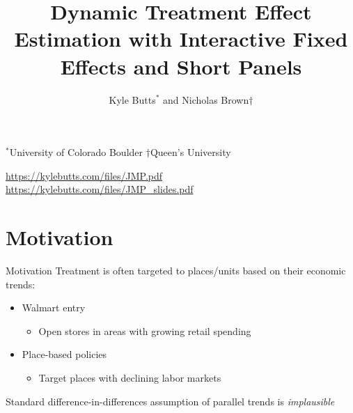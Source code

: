 \documentclass[aspectratio=169,t,11pt]{beamer}
\title{Dynamic Treatment Effect Estimation with Interactive Fixed Effects and Short Panels}
\author{\texorpdfstring{Kyle Butts$^*$ and Nicholas Brown$\dagger$}{Kyle Butts and Nicholas Brown}}
\begin{document}
\begin{frame}[plain]
  \maketitle

  {\footnotesize\color{zinc600}
    $^*$University of Colorado Boulder\hspace{2mm}
    $\dagger$Queen's University
  } 

  \vspace{20mm}
  {\footnotesize
    \url{https://kylebutts.com/files/JMP.pdf}\\[-2mm]
    \url{https://kylebutts.com/files/JMP_slides.pdf}
  }
\end{frame}

\section{Motivation}

\begin{frame}{Motivation}
  Treatment is often targeted to places/units based on their economic trends:

  \begin{itemize}    

    \pause
    \item Walmart entry 
    \begin{itemize}
      \item Open stores in areas with growing retail spending
    \end{itemize}

    \pause
    \item Place-based policies 
    \begin{itemize}
      \item Target places with declining labor markets 
    \end{itemize}
  \end{itemize}

  \bigskip\pause
  Standard difference-in-differences assumption of parallel trends is \emph{implausible}
\end{frame}
\end{document}
